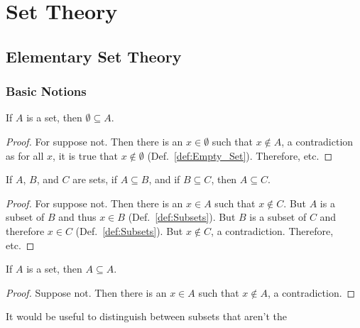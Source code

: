 \chapter{Set Theory}
    \section{Elementary Set Theory}
        \subsection{Basic Notions}
            \begin{theorem}
                \label{thm:Emptyset_Is_Subset}%
                If $A$ is a set, then $\emptyset\subseteq{A}$.
            \end{theorem}
            \begin{proof}
                For suppose not. Then there is an $x\in\emptyset$ such that
                $x\notin{A}$, a contradiction as for all $x$, it is true that
                $x\notin\emptyset$ (Def.~\ref{def:Empty_Set}). Therefore, etc.
            \end{proof}
            \begin{theorem}
                \label{thm:Subset_is_Transitive}%
                If $A$, $B$, and $C$ are sets, if $A\subseteq{B}$, and if
                $B\subseteq{C}$, then $A\subseteq{C}$.
            \end{theorem}
            \begin{proof}
                For suppose not. Then there is an $x\in{A}$ such that
                $x\notin{C}$. But $A$ is a subset of $B$ and thus $x\in{B}$
                (Def.~\ref{def:Subsets}). But $B$ is a subset of $C$ and
                therefore $x\in{C}$ (Def.~\ref{def:Subsets}). But $x\notin{C}$,
                a contradiction. Therefore, etc.
            \end{proof}
            \begin{theorem}
                \label{thm:Set_Is_Subset_Of_Self}%
                If $A$ is a set, then $A\subseteq{A}$.
            \end{theorem}
            \begin{proof}
                Suppose not. Then there is an $x\in{A}$
                such that $x\notin{A}$, a contradiction.
            \end{proof}
            It would be useful to distinguish between subsets that aren't the
